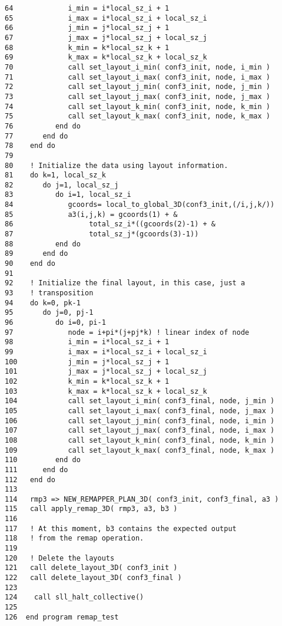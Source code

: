 \documentclass[]{report}   %
\begin{document}
\begin{verbatim}
64             i_min = i*local_sz_i + 1
65             i_max = i*local_sz_i + local_sz_i
66             j_min = j*local_sz_j + 1
67             j_max = j*local_sz_j + local_sz_j
68             k_min = k*local_sz_k + 1
69             k_max = k*local_sz_k + local_sz_k
70             call set_layout_i_min( conf3_init, node, i_min )
71             call set_layout_i_max( conf3_init, node, i_max )
72             call set_layout_j_min( conf3_init, node, j_min )
73             call set_layout_j_max( conf3_init, node, j_max )
74             call set_layout_k_min( conf3_init, node, k_min )
75             call set_layout_k_max( conf3_init, node, k_max )
76          end do
77       end do
78    end do
79      
80    ! Initialize the data using layout information.
81    do k=1, local_sz_k
82       do j=1, local_sz_j
83          do i=1, local_sz_i
84             gcoords= local_to_global_3D(conf3_init,(/i,j,k/))
85             a3(i,j,k) = gcoords(1) + &
86                  total_sz_i*((gcoords(2)-1) + &
87                  total_sz_j*(gcoords(3)-1))
88          end do
89       end do
90    end do
91
92    ! Initialize the final layout, in this case, just a 
93    ! transposition
94    do k=0, pk-1
95       do j=0, pj-1
96          do i=0, pi-1
97             node = i+pi*(j+pj*k) ! linear index of node
98             i_min = i*local_sz_i + 1
99             i_max = i*local_sz_i + local_sz_i
100            j_min = j*local_sz_j + 1
101            j_max = j*local_sz_j + local_sz_j
102            k_min = k*local_sz_k + 1
103            k_max = k*local_sz_k + local_sz_k
104            call set_layout_i_min( conf3_final, node, j_min )
105            call set_layout_i_max( conf3_final, node, j_max )
106            call set_layout_j_min( conf3_final, node, i_min )
107            call set_layout_j_max( conf3_final, node, i_max )
108            call set_layout_k_min( conf3_final, node, k_min )
109            call set_layout_k_max( conf3_final, node, k_max )
110         end do
111      end do
112   end do
113  
114   rmp3 => NEW_REMAPPER_PLAN_3D( conf3_init, conf3_final, a3 )
115   call apply_remap_3D( rmp3, a3, b3 )
116
117   ! At this moment, b3 contains the expected output
118   ! from the remap operation.
119  
120   ! Delete the layouts  
121   call delete_layout_3D( conf3_init )
122   call delete_layout_3D( conf3_final )
123
124    call sll_halt_collective()
125 
126  end program remap_test

\end{verbatim}
\end{document}
